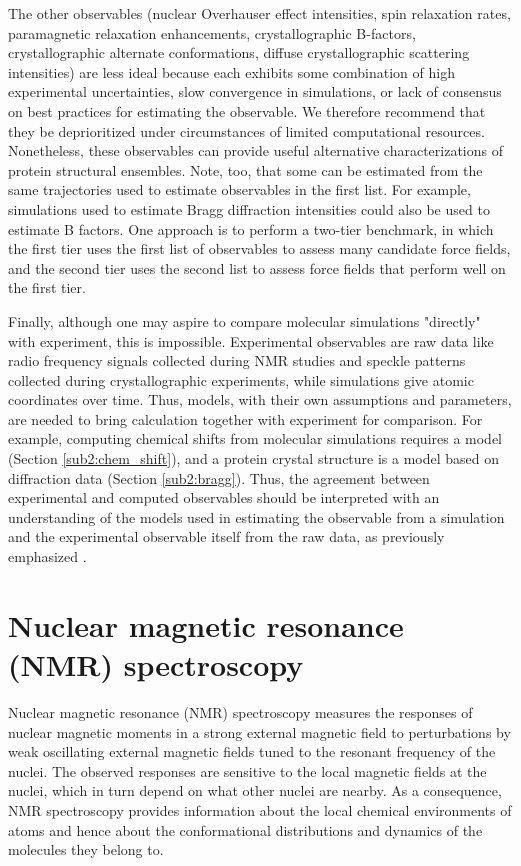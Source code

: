 \documentclass[9pt,review]{livecoms}
\begin{document}
The other observables (nuclear Overhauser effect intensities, spin relaxation rates, paramagnetic relaxation enhancements, crystallographic B-factors, crystallographic alternate conformations, diffuse crystallographic scattering intensities) are less ideal because each exhibits some combination of high experimental uncertainties, slow convergence in simulations, or lack of consensus on best practices for estimating the observable.
We therefore recommend that they be deprioritized under circumstances of limited computational resources.
Nonetheless, these observables can provide useful alternative characterizations of protein structural ensembles.
Note, too, that some can be estimated from the same trajectories used to estimate observables in the first list.
For example, simulations used to estimate Bragg diffraction intensities could also be used to estimate B factors.
One approach is to perform a two-tier benchmark, in which the first tier uses the first list of observables to assess many candidate force fields, and the second tier uses the second list to assess force fields that perform well on the first tier.

Finally, although one may aspire to compare molecular simulations "directly" with experiment, this is impossible.
Experimental observables are raw data like radio frequency signals collected during NMR studies and speckle patterns collected during crystallographic experiments, while simulations give atomic coordinates over time.
Thus, models, with their own assumptions and parameters, are needed to bring calculation together with experiment for comparison.
For example, computing chemical shifts from molecular simulations requires a model (Section \ref{sub2:chem_shift}), and a protein crystal structure is a model based on diffraction data (Section \ref{sub2:bragg}).
Thus, the agreement between experimental and computed observables should be interpreted with an understanding of the models used in estimating the observable from a simulation and the experimental observable itself from the raw data, as previously emphasized \cite{van_gunsteren_deriving_2016,van_gunsteren_validation_2018}.

\section{Nuclear magnetic resonance (NMR) spectroscopy}
\label{sec:nmr}

Nuclear magnetic resonance (NMR) spectroscopy measures the responses of nuclear magnetic moments in a strong external magnetic field to perturbations by weak oscillating external magnetic fields tuned to the resonant frequency of the nuclei.
The observed responses are sensitive to the local magnetic fields at the nuclei, which in turn depend on what other nuclei are nearby.
As a consequence, NMR spectroscopy provides information about the local chemical environments of atoms and hence about the conformational distributions and dynamics of the molecules they belong to.
\end{document}
